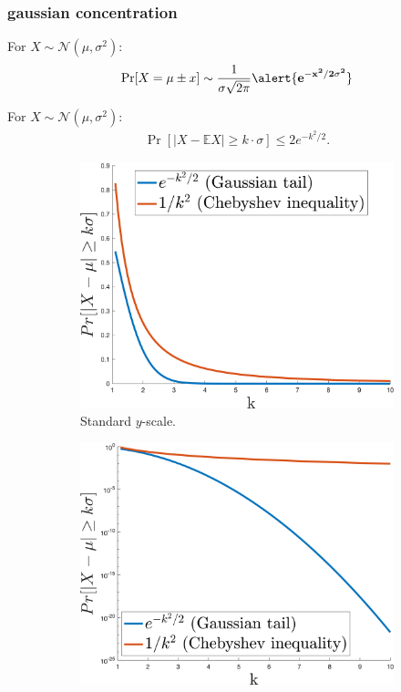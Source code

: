 \documentclass[handout,compress]{beamer}
\newcommand{\E}{\mathbb{E}}
\begin{document}
\begin{frame}
	\frametitle{gaussian concentration}
	\small
	For $X \sim \mathcal{N}(\mu,\sigma^2)$:
	\begin{align*}
		\Pr[X = \mu \pm x] \sim \frac{1}{\sigma\sqrt{2\pi}} \alert{\mathbf{e^{-x^2/2\sigma^2}}}
	\end{align*}
	\vspace{-1em}
	\begin{lemma}
		For $X \sim \mathcal{N}(\mu,\sigma^2)$:\vspace{-.5em}
		\begin{align*}
			\Pr[|X - \E X| \geq k\cdot\sigma] \leq 2e^{-k^2/2}.
		\end{align*}
	\end{lemma}
	\begin{figure}
		\begin{subfigure}[t]{0.45\textwidth}
			\centering
			\includegraphics[width=\textwidth]{standardScale.png}
			\caption{Standard $y$-scale.}
		\end{subfigure}
		\hspace{1em}
		\begin{subfigure}[t]{0.45\textwidth}
			\centering
			\includegraphics[width=\textwidth]{logScale.png}

\end{subfigure}
\end{figure}
\end{frame}
\end{document}
